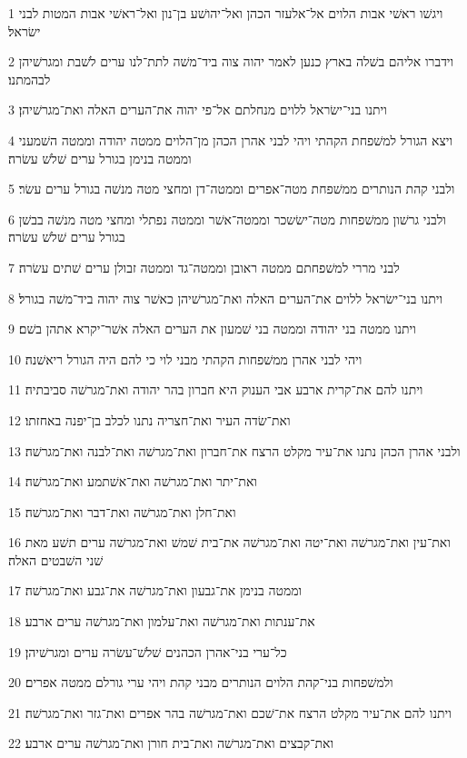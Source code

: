 \par 1 ויגשׁו ראשׁי אבות הלוים אל־אלעזר הכהן ואל־יהושׁע בן־נון ואל־ראשׁי אבות המטות לבני ישׂראל׃
\par 2 וידברו אליהם בשׁלה בארץ כנען לאמר יהוה צוה ביד־משׁה לתת־לנו ערים לשׁבת ומגרשׁיהן לבהמתנו׃
\par 3 ויתנו בני־ישׂראל ללוים מנחלתם אל־פי יהוה את־הערים האלה ואת־מגרשׁיהן׃
\par 4 ויצא הגורל למשׁפחת הקהתי ויהי לבני אהרן הכהן מן־הלוים ממטה יהודה וממטה השׁמעני וממטה בנימן בגורל ערים שׁלשׁ עשׂרה׃
\par 5 ולבני קהת הנותרים ממשׁפחת מטה־אפרים וממטה־דן ומחצי מטה מנשׁה בגורל ערים עשׂר׃
\par 6 ולבני גרשׁון ממשׁפחות מטה־ישׂשכר וממטה־אשׁר וממטה נפתלי ומחצי מטה מנשׁה בבשׁן בגורל ערים שׁלשׁ עשׂרה׃
\par 7 לבני מררי למשׁפחתם ממטה ראובן וממטה־גד וממטה זבולן ערים שׁתים עשׂרה׃
\par 8 ויתנו בני־ישׂראל ללוים את־הערים האלה ואת־מגרשׁיהן כאשׁר צוה יהוה ביד־משׁה בגורל׃
\par 9 ויתנו ממטה בני יהודה וממטה בני שׁמעון את הערים האלה אשׁר־יקרא אתהן בשׁם׃
\par 10 ויהי לבני אהרן ממשׁפחות הקהתי מבני לוי כי להם היה הגורל ריאשׁנה׃
\par 11 ויתנו להם את־קרית ארבע אבי הענוק היא חברון בהר יהודה ואת־מגרשׁה סביבתיה׃
\par 12 ואת־שׂדה העיר ואת־חצריה נתנו לכלב בן־יפנה באחזתו׃
\par 13 ולבני אהרן הכהן נתנו את־עיר מקלט הרצח את־חברון ואת־מגרשׁה ואת־לבנה ואת־מגרשׁה׃
\par 14 ואת־יתר ואת־מגרשׁה ואת־אשׁתמע ואת־מגרשׁה׃
\par 15 ואת־חלן ואת־מגרשׁה ואת־דבר ואת־מגרשׁה׃
\par 16 ואת־עין ואת־מגרשׁה ואת־יטה ואת־מגרשׁה את־בית שׁמשׁ ואת־מגרשׁה ערים תשׁע מאת שׁני השׁבטים האלה׃
\par 17 וממטה בנימן את־גבעון ואת־מגרשׁה את־גבע ואת־מגרשׁה׃
\par 18 את־ענתות ואת־מגרשׁה ואת־עלמון ואת־מגרשׁה ערים ארבע׃
\par 19 כל־ערי בני־אהרן הכהנים שׁלשׁ־עשׂרה ערים ומגרשׁיהן׃
\par 20 ולמשׁפחות בני־קהת הלוים הנותרים מבני קהת ויהי ערי גורלם ממטה אפרים׃
\par 21 ויתנו להם את־עיר מקלט הרצח את־שׁכם ואת־מגרשׁה בהר אפרים ואת־גזר ואת־מגרשׁה׃
\par 22 ואת־קבצים ואת־מגרשׁה ואת־בית חורן ואת־מגרשׁה ערים ארבע׃

